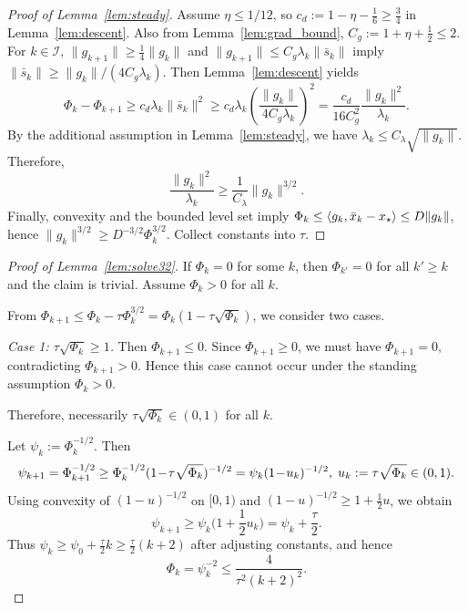\documentclass[review,onefignum,onetabnum]{siamart171218}
\begin{document}
\begin{proof}[Proof of Lemma~\ref{lem:steady}]
Assume $\eta\le 1/12$, so $c_d:=1-\eta-\frac16\ge \frac34$ in Lemma~\ref{lem:descent}.
Also from Lemma~\ref{lem:grad_bound}, $C_g:=1+\eta+\frac12\le 2$.
For $k\in\mathcal I$, $\|g_{k+1}\|\ge \frac14\|g_k\|$ and $\|g_{k+1}\|\le C_g\lambda_k\|\bar s_k\|$ imply
$\|\bar s_k\|\ge \|g_k\|/(4C_g\lambda_k)$.
Then Lemma~\ref{lem:descent} yields
\[
\Phi_k-\Phi_{k+1}\ge c_d\lambda_k\|\bar s_k\|^2
\ge c_d\lambda_k\left(\frac{\|g_k\|}{4C_g\lambda_k}\right)^2
=\frac{c_d}{16C_g^2}\frac{\|g_k\|^2}{\lambda_k}.
\]
By the additional assumption in Lemma~\ref{lem:steady}, we have $\lambda_k\le C_\lambda\sqrt{\|g_k\|}$.
Therefore,
\[
\frac{\|g_k\|^2}{\lambda_k}\ge \frac{1}{C_\lambda}\|g_k\|^{3/2}.
\]
Finally, convexity and the bounded level set imply $\Phi_k\le \left\langle g_k,\bar x_k-x_\star\right\rangle\le D\|g_k\|$, hence
$\|g_k\|^{3/2}\ge D^{-3/2}\Phi_k^{3/2}$.
Collect constants into $\tau$.
\end{proof}

\begin{proof}[Proof of Lemma~\ref{lem:solve32}]
If $\Phi_k=0$ for some $k$, then $\Phi_{k'}=0$ for all $k'\ge k$ and the claim is trivial.
Assume $\Phi_k>0$ for all $k$.

From $\Phi_{k+1}\le \Phi_k-\tau \Phi_k^{3/2}=\Phi_k(1-\tau\sqrt{\Phi_k})$, we consider two cases.

\emph{Case 1: $\tau\sqrt{\Phi_k}\ge 1$.}
Then $\Phi_{k+1}\le 0$. Since $\Phi_{k+1}\ge 0$, we must have $\Phi_{k+1}=0$,
contradicting $\Phi_{k+1}>0$.
Hence this case cannot occur under the standing assumption $\Phi_k>0$.

Therefore, necessarily $\tau\sqrt{\Phi_k}\in(0,1)$ for all $k$.

Let $\psi_k:=\Phi_k^{-1/2}$. Then
\[
\psi_{k+1}=\Phi_{k+1}^{-1/2}\ge \Phi_k^{-1/2}(1\!-\!\tau\sqrt{\Phi_k})^{-1/2}\\
=\psi_k(1\!-\!u_k)^{-1/2},\; u_k:=\tau\sqrt{\Phi_k}\in(0,1).
\]
Using convexity of $(1-u)^{-1/2}$ on $[0,1)$ and $(1-u)^{-1/2}\ge 1+\frac12u$, we obtain
\[
\psi_{k+1}\ge \psi_k\Big(1+\frac12 u_k\Big)=\psi_k+\frac{\tau}{2}.
\]
Thus $\psi_k\ge \psi_0+\frac{\tau}{2}k\ge \frac{\tau}{2}(k+2)$ after adjusting constants, and hence
\[
\Phi_k=\psi_k^{-2}\le \frac{4}{\tau^2(k+2)^2}.
\]
\end{proof}
\end{document}
